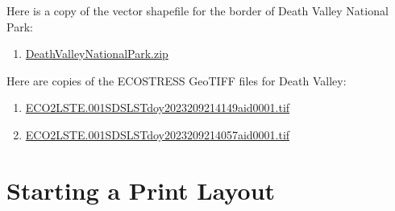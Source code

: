 \documentclass[oneside,a4paper,11pt,explicit]{book}
\begin{document}
\begin{tcolorbox}[colback=yellow!5!white,title=\textbf{Datafiles}]
	\large
        Here is a copy of the vector shapefile for the border of Death Valley National Park:
        \begin{enumerate}
            \item \href{https://jeremydforsythe.github.io/icecream-tutorials/Tutorial4_AccessingRemoteSensingDataWithAppears/DeathValleyNationalPark.zip}{DeathValleyNationalPark.zip}
        \end{enumerate}
	Here are copies of the ECOSTRESS GeoTIFF files for Death Valley:
	\begin{enumerate}
		\item \href{https://jeremydforsythe.github.io/icecream-tutorials/Tutorial4_AccessingRemoteSensingDataWithAppears/ECO2LSTE.001_SDS_LST_doy2023209214149_aid0001.tif}{\small ECO2LSTE.001\textunderscore SDS\textunderscore LST\textunderscore doy2023209214149\textunderscore aid0001.tif}
		\item \href{https://jeremydforsythe.github.io/icecream-tutorials/Tutorial4_AccessingRemoteSensingDataWithAppears/ECO2LSTE.001_SDS_LST_doy2023209214057_aid0001.tif}{\small ECO2LSTE.001\textunderscore SDS\textunderscore LST\textunderscore doy2023209214057\textunderscore aid0001.tif}
	\end{enumerate}
\end{tcolorbox}

\section{Starting a Print Layout}
\end{document}
